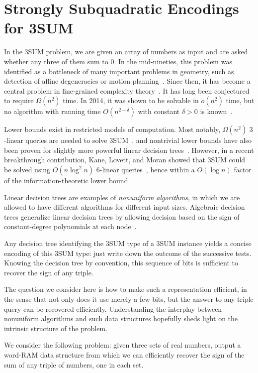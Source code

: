 \section{Strongly Subquadratic Encodings for 3SUM}

In the 3SUM problem, we are given an array of numbers as input and are asked
whether any three of them sum to \(0\). In the mid-nineties, this problem was
identified as a bottleneck of many important problems in geometry, such as
detection of affine degeneracies or motion planning~\cite{GO95}. Since then, it
has become a central problem in fine-grained complexity theory~\cite{PW10}. It
has long been conjectured to require $\Omega(n^2)$ time. In 2014, it was shown
to be solvable in $o(n^2)$ time, but no algorithm with running time
$O(n^{2-\delta})$ with constant $\delta>0$ is known~\cite{GP18}.

Lower bounds exist in restricted models of computation. Most notably,
$\Omega(n^2)$ \(3\)-linear queries are needed to solve 3SUM~\cite{Er99a}, and
nontrivial lower bounds have also been proven for slightly more powerful linear
decision trees~\cite{AC05}. However, in a recent breakthrough contribution,
Kane, Lovett, and Moran showed that 3SUM could be solved using $O(n\log^2 n)$
6-linear queries~\cite{KLM18}, hence within a $O(\log n)$ factor of the
information-theoretic lower bound.

Linear decision trees are examples of {\em nonuniform algorithms}, in which we
are allowed to have different algorithms for different input sizes.
Algebraic decision trees generalize linear decision trees
by allowing decision based on the sign of constant-degree polynomials at each
node~\cite{SY82}.

Any decision tree identifying the 3SUM type of a 3SUM instance yields a concise
encoding of this 3SUM type:
just write down the outcome of the successive tests. Knowing the decision tree
by convention, this sequence of bits is sufficient to recover the sign of any
triple.

The question we consider here is how to make such a representation efficient,
in the sense that not only does it use merely a few bits, but the answer to any
triple query can be recovered efficiently. Understanding the interplay between
nonuniform algorithms and such data structures hopefully sheds light on the
intrinsic structure of the problem.

We consider the following problem: given three sets of real numbers, output a
word-RAM data structure from which we can efficiently recover the sign of the
sum of any triple of numbers, one in each set.

